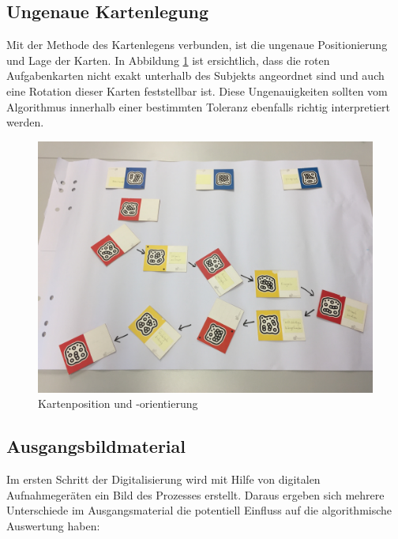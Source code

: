 \subsection{Ungenaue Kartenlegung} %
\label{ssub:ungenaue_kartenlegung}
Mit der Methode des Kartenlegens verbunden, ist die ungenaue Positionierung und Lage der Karten. In Abbildung \ref{fig:karten-position} ist ersichtlich, dass die roten Aufgabenkarten nicht exakt unterhalb des Subjekts angeordnet sind und auch eine Rotation dieser Karten feststellbar ist. Diese Ungenauigkeiten sollten vom Algorithmus innerhalb einer bestimmten Toleranz ebenfalls richtig interpretiert werden.

\begin{figure}[h]
	\centering 
	\begin{minipage}[b]{0.8\textwidth} 
		\includegraphics[width=\textwidth]{figures/02.jpg}
		\caption[Kartenposition und -orientierung]{Kartenposition und -orientierung  \protect~\cite{max}}
		\label{fig:karten-position} 
	\end{minipage}
\end{figure}

\subsection{Ausgangsbildmaterial} %
\label{sub:ausgangsbildmaterial}
Im ersten Schritt der Digitalisierung wird mit Hilfe von digitalen Aufnahmegeräten ein Bild des Prozesses erstellt. Daraus ergeben sich mehrere Unterschiede im Ausgangsmaterial die potentiell Einfluss auf die algorithmische Auswertung haben:

